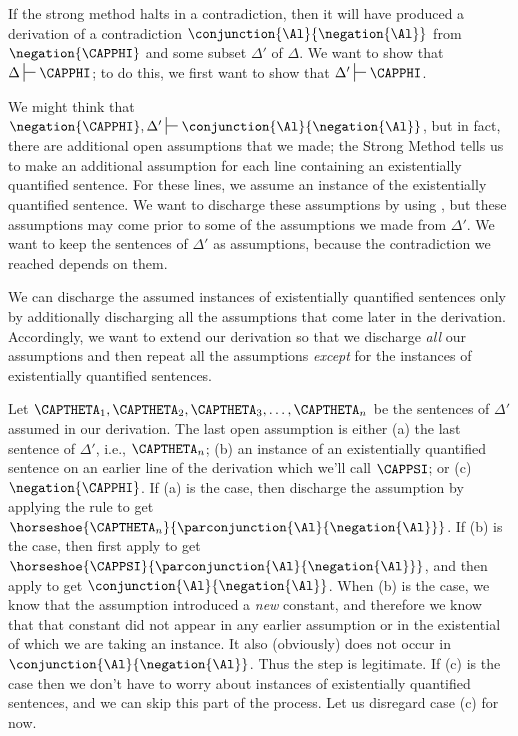 \begin{PROOF}
If the strong method halts in a contradiction, then it will have produced a derivation of a contradiction $\conjunction{\Al}{\negation{\Al}}$ from $\negation{\CAPPHI}$ and some subset $\Delta'$ of $\Delta$.  We want to show that $\Delta\sststile{}{}\CAPPHI$; to do this, we first want to show that $\Delta'\sststile{}{}\CAPPHI$.

We might think that $\negation{\CAPPHI},\Delta'\sststile{}{}\conjunction{\Al}{\negation{\Al}}$, but in fact, there are additional open assumptions that we made; the Strong Method tells us to make an additional assumption for each line containing an existentially quantified sentence. For these lines, we assume an instance of the existentially quantified sentence.  We want to discharge these assumptions by using , but these assumptions may come prior to some of the assumptions we made from $\Delta'$.  We want to keep the sentences of $\Delta'$ as assumptions, because the contradiction we reached depends on them. 

We can discharge the assumed instances of existentially quantified sentences only by additionally discharging all the assumptions that come later in the derivation.  Accordingly, we want to extend our derivation so that we discharge \emph{all} our assumptions and then repeat all the assumptions \emph{except} for the instances of existentially quantified sentences. 

Let $\CAPTHETA_1, \CAPTHETA_2, \CAPTHETA_3, \ldots, \CAPTHETA_{\integer{n}}$ be the sentences of $\Delta'$ assumed in our derivation.  The last open assumption is either (a) the last sentence of $\Delta'$, i.e., $\CAPTHETA_{\integer{n}}$; (b) an instance of an existentially quantified sentence on an earlier line of the derivation which we'll call $\CAPPSI$; or (c) $\negation{\CAPPHI}$.  If (a) is the case, then discharge the assumption by applying the rule  to get $\horseshoe{\CAPTHETA_{\integer{n}}}{\parconjunction{\Al}{\negation{\Al}}}$.  If (b) is the case, then first apply  to get $\horseshoe{\CAPPSI}{\parconjunction{\Al}{\negation{\Al}}}$, and then apply  to get $\conjunction{\Al}{\negation{\Al}}$.  When (b) is the case, we know that the assumption introduced a \emph{new} constant, and therefore we know that that constant did not appear in any earlier assumption or in the existential of which we are taking an instance.
It also (obviously) does not occur in $\conjunction{\Al}{\negation{\Al}}$.
Thus the  step is legitimate. If (c) is the case then we don't have to worry about instances of existentially quantified sentences, and we can skip this part of the process.  Let us disregard case (c) for now.


\end{PROOF}
